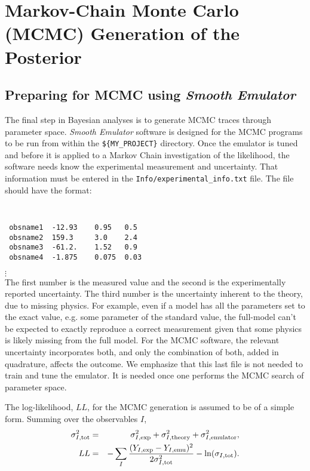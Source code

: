 \documentclass[UserManual.tex]{subfiles}
\begin{document}
\setcounter{section}{6}
\section{Markov-Chain Monte Carlo (MCMC) Generation of the Posterior}\label{sec:mcmc}

\subsection{Preparing for MCMC using {\it Smooth Emulator}}

The final step in Bayesian analyses is to generate MCMC traces through parameter space. {\it Smooth Emulator} software is designed for the MCMC programs to be run from within the {\tt \$\{MY\_PROJECT\}} directory. Once the emulator is tuned and before it is applied to a Markov Chain investigation of the likelihood, the software needs know the experimental measurement and uncertainty. That information must be entered in the {\tt Info/experimental\_info.txt} file. The file should have the format:
{\tt
\begin{verbatim}
 obsname1  -12.93    0.95   0.5
 obsname2  159.3     3.0    2.4
 obsname3  -61.2.    1.52   0.9
 obsname4  -1.875    0.075  0.03
\end{verbatim}}
\vspace*{-16pt}
 \hspace*{28pt}$\vdots$\\
The first number is the measured value and the second is the experimentally reported uncertainty. The third number is the uncertainty inherent to the theory, due to missing physics. For example, even if a model has all the parameters set to the exact value, e.g. some parameter of the standard value, the full-model can't be expected to exactly reproduce a correct measurement given that some physics is likely missing from the full model. For the MCMC software, the relevant uncertainty incorporates both, and only the combination of both, added in quadrature, affects the outcome. We emphasize that this last file is not needed to train and tune the emulator. It is needed once one performs the MCMC search of parameter space.

The log-likelihood, $LL$, for the MCMC generation is assumed to be of a simple form. Summing over the observables $I$,
\begin{eqnarray*}
\sigma_{I,{\rm tot}}^{2}&=&\sigma_{I,{\rm exp}}^2+\sigma_{I,{\rm theory}}^2+\sigma_{I,{\rm emulator}}^2,\\
LL&=&-\sum_{I}\frac{(Y_{I,{\rm exp}}-Y_{I,{\rm emu}})^{2}}{2\sigma_{I,{\rm tot}}^{2}}-\ln(\sigma_{I,{\rm tot}}).
\end{eqnarray*}
\end{document}
